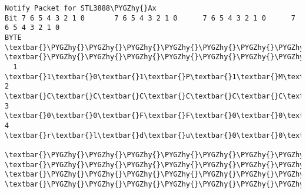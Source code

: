 \documentclass[a4paper,8pt,english]{sphinxmanual}
\def\PYGZhy{\char`\-}
\begin{document}
\begin{Verbatim}[commandchars=\\\{\}]
Notify Packet for STL3888\PYGZhy{}Ax
Bit 7 6 5 4 3 2 1 0       7 6 5 4 3 2 1 0      7 6 5 4 3 2 1 0      7 6 5 4 3 2 1 0
BYTE  \textbar{}\PYGZhy{}\PYGZhy{}\PYGZhy{}\PYGZhy{}\PYGZhy{}\PYGZhy{}\PYGZhy{}\PYGZhy{}\PYGZhy{}\PYGZhy{}\PYGZhy{}\PYGZhy{}\PYGZhy{}\PYGZhy{}\PYGZhy{}\textbar{}BYTE \textbar{}\PYGZhy{}\PYGZhy{}\PYGZhy{}\PYGZhy{}\PYGZhy{}\PYGZhy{}\PYGZhy{}\PYGZhy{}\PYGZhy{}\PYGZhy{}\PYGZhy{}\PYGZhy{}\PYGZhy{}\PYGZhy{}\PYGZhy{}\textbar{}BYTE\textbar{}\PYGZhy{}\PYGZhy{}\PYGZhy{}\PYGZhy{}\PYGZhy{}\PYGZhy{}\PYGZhy{}\PYGZhy{}\PYGZhy{}\PYGZhy{}\PYGZhy{}\PYGZhy{}\PYGZhy{}\PYGZhy{}\PYGZhy{}\textbar{}BYTE\textbar{}\PYGZhy{}\PYGZhy{}\PYGZhy{}\PYGZhy{}\PYGZhy{}\PYGZhy{}\PYGZhy{}\PYGZhy{}\PYGZhy{}\PYGZhy{}\PYGZhy{}\PYGZhy{}\PYGZhy{}\PYGZhy{}\PYGZhy{}\textbar{}
  1   \textbar{}1\textbar{}0\textbar{}1\textbar{}P\textbar{}1\textbar{}M\textbar{}R\textbar{}L\textbar{}  2  \textbar{}C\textbar{}C\textbar{}C\textbar{}C\textbar{}C\textbar{}C\textbar{}C\textbar{}C\textbar{}  3 \textbar{}0\textbar{}0\textbar{}F\textbar{}F\textbar{}0\textbar{}0\textbar{}0\textbar{}i\textbar{}  4 \textbar{}r\textbar{}l\textbar{}d\textbar{}u\textbar{}0\textbar{}0\textbar{}0\textbar{}0\textbar{}
      \textbar{}\PYGZhy{}\PYGZhy{}\PYGZhy{}\PYGZhy{}\PYGZhy{}\PYGZhy{}\PYGZhy{}\PYGZhy{}\PYGZhy{}\PYGZhy{}\PYGZhy{}\PYGZhy{}\PYGZhy{}\PYGZhy{}\PYGZhy{}\textbar{}     \textbar{}\PYGZhy{}\PYGZhy{}\PYGZhy{}\PYGZhy{}\PYGZhy{}\PYGZhy{}\PYGZhy{}\PYGZhy{}\PYGZhy{}\PYGZhy{}\PYGZhy{}\PYGZhy{}\PYGZhy{}\PYGZhy{}\PYGZhy{}\textbar{}    \textbar{}\PYGZhy{}\PYGZhy{}\PYGZhy{}\PYGZhy{}\PYGZhy{}\PYGZhy{}\PYGZhy{}\PYGZhy{}\PYGZhy{}\PYGZhy{}\PYGZhy{}\PYGZhy{}\PYGZhy{}\PYGZhy{}\PYGZhy{}\textbar{}    \textbar{}\PYGZhy{}\PYGZhy{}\PYGZhy{}\PYGZhy{}\PYGZhy{}\PYGZhy{}\PYGZhy{}\PYGZhy{}\PYGZhy{}\PYGZhy{}\PYGZhy{}\PYGZhy{}\PYGZhy{}\PYGZhy{}\PYGZhy{}\textbar{}


\end{Verbatim}
\end{document}
